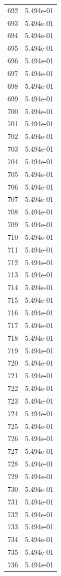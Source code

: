 \documentclass[12pt]{article}
\begin{document}
\begin{longtable}{@{}cc@{}}
692 & 5.494e-01 \\
693 & 5.494e-01 \\
694 & 5.494e-01 \\
695 & 5.494e-01 \\
696 & 5.494e-01 \\
697 & 5.494e-01 \\
698 & 5.494e-01 \\
699 & 5.494e-01 \\
700 & 5.494e-01 \\
701 & 5.494e-01 \\
702 & 5.494e-01 \\
703 & 5.494e-01 \\
704 & 5.494e-01 \\
705 & 5.494e-01 \\
706 & 5.494e-01 \\
707 & 5.494e-01 \\
708 & 5.494e-01 \\
709 & 5.494e-01 \\
710 & 5.494e-01 \\
711 & 5.494e-01 \\
712 & 5.494e-01 \\
713 & 5.494e-01 \\
714 & 5.494e-01 \\
715 & 5.494e-01 \\
716 & 5.494e-01 \\
717 & 5.494e-01 \\
718 & 5.494e-01 \\
719 & 5.494e-01 \\
720 & 5.494e-01 \\
721 & 5.494e-01 \\
722 & 5.494e-01 \\
723 & 5.494e-01 \\
724 & 5.494e-01 \\
725 & 5.494e-01 \\
726 & 5.494e-01 \\
727 & 5.494e-01 \\
728 & 5.494e-01 \\
729 & 5.494e-01 \\
730 & 5.494e-01 \\
731 & 5.494e-01 \\
732 & 5.494e-01 \\
733 & 5.494e-01 \\
734 & 5.494e-01 \\
735 & 5.494e-01 \\
736 & 5.494e-01 \\

\end{longtable}
\end{document}
